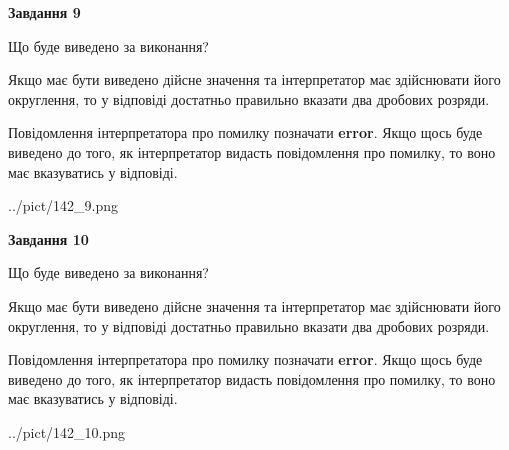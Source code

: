 \documentclass[12pt, ukrainian]{article}
\begin{document}
{\begin {Large}
{\begin {center}\textbf{Завдання 9}\end {center}}\par
Що буде виведено за виконання? \par

Якщо має бути виведено дійсне значення та інтерпретатор має здійснювати його округлення, 
то у відповіді достатньо правильно вказати два дробових розряди.

Повідомлення інтерпретатора про помилку позначати \textbf{error}.
Якщо щось буде виведено до того, як інтерпретатор видасть повідомлення про помилку, 
то воно має вказуватись у відповіді. \par

\begin{center}
	{../pict/142_9.png}
\end{center}
\newpage

{\begin {center}\textbf{Завдання 10}\end {center}}\par
Що буде виведено за виконання? \par

Якщо має бути виведено дійсне значення та інтерпретатор має здійснювати його округлення, 
то у відповіді достатньо правильно вказати два дробових розряди.

Повідомлення інтерпретатора про помилку позначати \textbf{error}.
Якщо щось буде виведено до того, як інтерпретатор видасть повідомлення про помилку, 
то воно має вказуватись у відповіді. \par

\begin{center}
	{../pict/142_10.png}
\end{center}
\newpage

\end {Large}}
\end{document}
